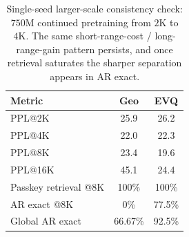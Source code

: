 \begin{table}[t]
\caption{Single-seed larger-scale consistency check: \(750\mathrm{M}\) continued pretraining from \(2\mathrm{K}\) to \(4\mathrm{K}\). The same short-range-cost / long-range-gain pattern persists, and once retrieval saturates the sharper separation appears in AR exact.}
\centering
\small
\begin{tabular}{@{}lcc@{}}
\toprule
Metric & Geo & EVQ \\
\midrule
PPL@2K & 25.9 & 26.2 \\
PPL@4K & 22.0 & 22.3 \\
PPL@8K & 23.4 & 19.6 \\
PPL@16K & 45.1 & 24.4 \\
\midrule
Passkey retrieval @8K & 100\% & 100\% \\
AR exact @8K & 0\% & 77.5\% \\
Global AR exact & 66.67\% & 92.5\% \\
\bottomrule
\end{tabular}
\end{table}
